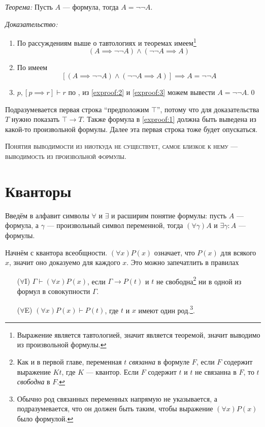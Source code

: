 {\it Теорема:} Пусть $A$ --- формула, тогда $A=\lnot\lnot A$.

	{\it Доказательство:}
\begin{enumerate}[label=(\arabic*)]
	\item{}По рассуждениям выше о тавтологиях и теоремах
	имеем\footnote{Выражение является тавтологией, значит является теоремой,
		значит выводимо из произвольной формулы.}
	\[
		(A\implies \lnot\lnot A)\land (\lnot\lnot A\implies A)
	\]
	\label{exproof:2}

	\item{}По \axiom{} имеем
	\label{exproof:3}
	\[
		[(A\implies \lnot\lnot A)\land (\lnot\lnot A\implies A)]\implies A=\lnot\lnot A
	\]
	\item{}${p,[p\implies r]\vdash r}$ по \taut{},
	из \ref{exproof:2} и \ref{exproof:3}
	можем вывести $A=\lnot\lnot A$.\qed
\end{enumerate}

Подразумевается первая строка ``предположим $\top$'', потому что для доказательства
$T$ нужно показать $\top\to T$. Также формула в \ref{exproof:1} должна быть выведена
из какой-то произвольной формулы. Далее эта первая строка тоже будет опускаться.

\textsc{Понятия выводимости из ниоткуда не существует,
	самое близкое к нему --- выводимость из произвольной формулы.}

\section{Кванторы}

\newcommand\Aii{$\forall$I}
\newcommand\Aee{$\forall$E}
\newcommand\Eii{$\exists$I}
\newcommand\Eee{$\exists$E}

Введём в алфавит символы $\forall$ и $\exists$ и расширим понятие формулы:
пусть $A$ --- формула, а $\gamma$ --- произвольный символ переменной,
тогда $(\forall\gamma)A$ и $\exists\gamma:A$ --- формулы.

Начнём с квантора всеобщности. $(\forall x)P(x)$ означает, что $P(x)$ для
всякого $x$, значит оно доказуемо для каждого $x$. Это можно запечатлить
в правилах
\begin{enumerate}
	\item[(\Aii{})]{}$\Gamma\vdash(\forall x)P(x)$, если $\Gamma\to P(t)$ и $t$
	не свободна\footnote{
		Как и в первой главе, переменная $t$ {\it связанна} в формуле $F$,
		если $F$ содержит
		выражение $Kt$, где $K$ --- квантор. Если $F$ содержит $t$ и $t$ не связанна
		в $F$, то $t$ {\it свободна} в $F$.
	} ни в одной из формул в совокупности $\Gamma$.

	\item[(\Aee{})]{}$(\forall x)P(x)\vdash P(t)$, где $t$ и $x$
	имеют один род.\footnote{
		Обычно род связанных переменных напрямую не указывается, а подразумевается,
		что он должен быть таким, чтобы выражение $(\forall x)P(x)$ было формулой.
	}.
\end{enumerate}

